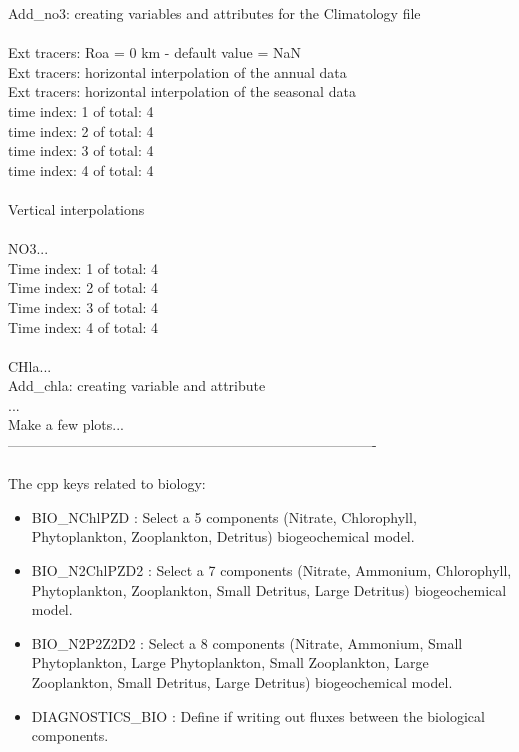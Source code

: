 Add\_no3: creating variables and attributes for the Climatology file\\
\\ 
 Ext tracers: Roa = 0 km - default value = NaN\\
 Ext tracers: horizontal interpolation of the annual data\\
 Ext tracers: horizontal interpolation of the seasonal data\\
time index: 1 of total: 4\\
time index: 2 of total: 4\\
time index: 3 of total: 4\\
time index: 4 of total: 4\\
 \\
 Vertical interpolations\\
 \\
 NO3...\\
 Time index: 1 of total: 4\\
 Time index: 2 of total: 4\\
 Time index: 3 of total: 4\\
 Time index: 4 of total: 4\\
 \\
 CHla...\\
Add\_chla: creating variable and attribute\\
...\\
Make a few plots...\\
-------------------------------------------------------------------------------\\\\
The cpp keys related to biology:
\begin{itemize}
\item BIO\_NChlPZD : Select a 5 components (Nitrate, Chlorophyll, Phytoplankton, 
Zooplankton, Detritus) biogeochemical model.
\item BIO\_N2ChlPZD2 : Select a 7 components (Nitrate, Ammonium, Chlorophyll, 
Phytoplankton, Zooplankton, Small Detritus, Large Detritus) biogeochemical model. 
\item BIO\_N2P2Z2D2 : Select a 8 components (Nitrate, Ammonium, Small  
Phytoplankton, Large Phytoplankton, Small Zooplankton, Large Zooplankton,
Small Detritus, Large Detritus) biogeochemical model. 
\item DIAGNOSTICS\_BIO : Define if writing out fluxes between the biological
components.\\
\end{itemize}
